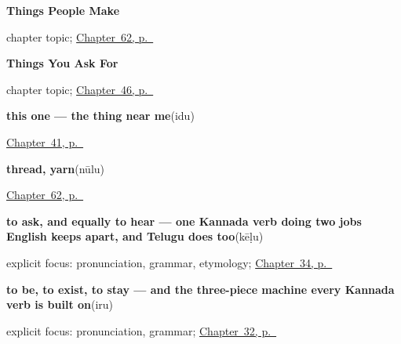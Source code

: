 \noindent\begin{minipage}[t]{\linewidth}
\raggedright
\textbf{Things People Make}\par
\footnotesize chapter topic; \hyperref[ch:ka-made]{Chapter~62, p.~\pageref*{ch:ka-made}}
\end{minipage}\par\smallskip

\noindent\begin{minipage}[t]{\linewidth}
\raggedright
\textbf{Things You Ask For}\par
\footnotesize chapter topic; \hyperref[ch:ka-ask-for]{Chapter~46, p.~\pageref*{ch:ka-ask-for}}
\end{minipage}\par\smallskip

\noindent\begin{minipage}[t]{\linewidth}
\raggedright
\textbf{this one — the thing near me}\enspace\emph{}\enspace(idu)\par
\footnotesize \hyperref[ch:kn-pointing-and-asking]{Chapter~41, p.~\pageref*{ch:kn-pointing-and-asking}}
\end{minipage}\par\smallskip

\noindent\begin{minipage}[t]{\linewidth}
\raggedright
\textbf{thread, yarn}\enspace\emph{}\enspace(nūlu)\par
\footnotesize \hyperref[ch:ka-made]{Chapter~62, p.~\pageref*{ch:ka-made}}
\end{minipage}\par\smallskip

\noindent\begin{minipage}[t]{\linewidth}
\raggedright
\textbf{to ask, and equally to hear — one Kannada verb doing two jobs English keeps apart, and Telugu does too}\enspace\emph{}\enspace(kēḷu)\par
\footnotesize explicit focus: pronunciation, grammar, etymology; \hyperref[ch:ka-social-verbs]{Chapter~34, p.~\pageref*{ch:ka-social-verbs}}
\end{minipage}\par\smallskip

\noindent\begin{minipage}[t]{\linewidth}
\raggedright
\textbf{to be, to exist, to stay — and the three-piece machine every Kannada verb is built on}\enspace\emph{}\enspace(iru)\par
\footnotesize explicit focus: pronunciation, grammar; \hyperref[ch:ka-core-verbs]{Chapter~32, p.~\pageref*{ch:ka-core-verbs}}
\end{minipage}\par\smallskip


